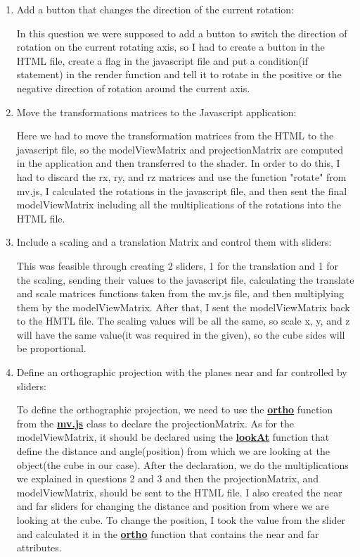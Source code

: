 \documentclass{article}
\begin{document}
\begin{enumerate}
\item Add a button that changes the direction of the current rotation:

In this question we were supposed to add a button to switch the direction of rotation on the current rotating axis, so I had to create a button in the HTML file, create a flag in the javascript file and put a condition(if statement) in the render function and tell it to rotate in the positive or the negative direction of rotation around the current axis.

\item Move the transformations matrices to the Javascript application:

Here we had to move the transformation matrices from the HTML to the javascript file, so the modelViewMatrix and projectionMatrix are computed in the application and then transferred to the 
shader. In order to do this, I had to discard the rx, ry, and rz matrices and use the function "rotate" from mv.js, I calculated the rotations in the javascript file, and then sent the final modelViewMatrix including all the multiplications of the rotations into the HTML file.

\item Include a scaling and a translation Matrix and control them with sliders:

This was feasible through creating 2 sliders, 1 for the translation and 1 for the scaling, sending their values to the javascript file, calculating the translate and scale matrices functions taken from the mv.js file, and then multiplying them by the modelViewMatrix. After that, I sent the modelViewMatrix back to the HMTL file. The scaling values will be all the same, so scale x, y, and z will have the same value(it was required in the given), so the cube sides will be proportional.

\item Define an orthographic projection with the planes near and far controlled by sliders:

To define the orthographic projection, we need to use the \textbf{\underline {ortho}} function from the \textbf{\underline{mv.js}} class to declare the projectionMatrix. As for the modelViewMatrix, it should be declared using the \textbf{\underline {lookAt}} function that define the distance and angle(position) from which we are looking at the object(the cube in our case). After the declaration, we do the multiplications we explained in questions 2 and 3 and then the projectionMatrix, and modelViewMatrix, should be sent to the HTML file. I also created the near and far sliders for changing the distance and position from where we are looking at the cube. To change the position, I took the value from the slider and calculated it in the \textbf{\underline {ortho}} function that contains the near and far attributes.


\end{enumerate}
\end{document}
